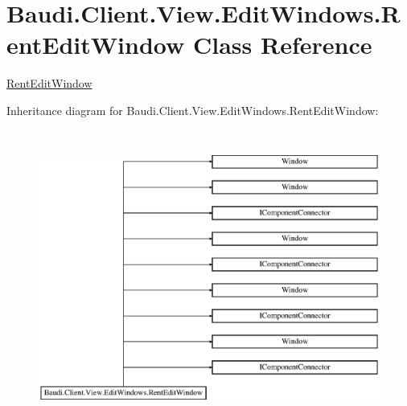 \hypertarget{class_baudi_1_1_client_1_1_view_1_1_edit_windows_1_1_rent_edit_window}{}\section{Baudi.\+Client.\+View.\+Edit\+Windows.\+Rent\+Edit\+Window Class Reference}
\label{class_baudi_1_1_client_1_1_view_1_1_edit_windows_1_1_rent_edit_window}


\hyperlink{class_baudi_1_1_client_1_1_view_1_1_edit_windows_1_1_rent_edit_window}{Rent\+Edit\+Window}  


Inheritance diagram for Baudi.\+Client.\+View.\+Edit\+Windows.\+Rent\+Edit\+Window\+:\begin{figure}[H]
\begin{center}
\leavevmode
\includegraphics[height=9.688581cm]{class_baudi_1_1_client_1_1_view_1_1_edit_windows_1_1_rent_edit_window}
\end{center}
\end{figure}
